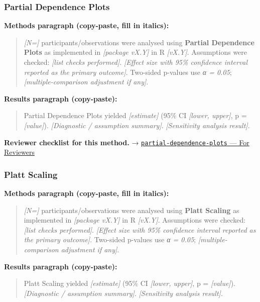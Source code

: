 \documentclass[
]{article}
\begin{document}
\subsubsection{Partial Dependence Plots}\label{partial-dependence-plots}

\textbf{Methods paragraph (copy-paste, fill in italics):}

\begin{quote}
\emph{{[}N={]}} participants/observations were analysed using
\textbf{Partial Dependence Plots} as implemented in \emph{{[}package
vX.Y{]}} in R \emph{{[}vX.Y{]}}. Assumptions were checked: \emph{{[}list
checks performed{]}}. \emph{{[}Effect size with 95\% confidence interval
reported as the primary outcome{]}}. Two-sided p-values use \emph{α =
0.05}; \emph{{[}multiple-comparison adjustment if any{]}}.
\end{quote}

\textbf{Results paragraph (copy-paste):}

\begin{quote}
Partial Dependence Plots yielded \emph{{[}estimate{]}} (95\% CI
\emph{{[}lower, upper{]}}, p = \emph{{[}value{]}}). \emph{{[}Diagnostic
/ assumption summary{]}}. \emph{{[}Sensitivity analysis result{]}}.
\end{quote}

\textbf{Reviewer checklist for this method.} →
\href{../chapters/13-ml/partial-dependence-plots.Rmd\#for-reviewers}{\texttt{partial-dependence-plots}
--- For Reviewers}

\subsubsection{Platt Scaling}\label{platt-scaling}

\textbf{Methods paragraph (copy-paste, fill in italics):}

\begin{quote}
\emph{{[}N={]}} participants/observations were analysed using
\textbf{Platt Scaling} as implemented in \emph{{[}package vX.Y{]}} in R
\emph{{[}vX.Y{]}}. Assumptions were checked: \emph{{[}list checks
performed{]}}. \emph{{[}Effect size with 95\% confidence interval
reported as the primary outcome{]}}. Two-sided p-values use \emph{α =
0.05}; \emph{{[}multiple-comparison adjustment if any{]}}.
\end{quote}

\textbf{Results paragraph (copy-paste):}

\begin{quote}
Platt Scaling yielded \emph{{[}estimate{]}} (95\% CI \emph{{[}lower,
upper{]}}, p = \emph{{[}value{]}}). \emph{{[}Diagnostic / assumption
summary{]}}. \emph{{[}Sensitivity analysis result{]}}.
\end{quote}
\end{document}
